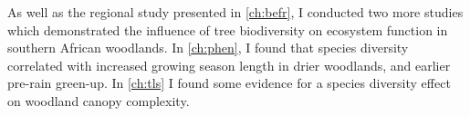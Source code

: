 \begin{refsection}
As well as the regional study presented in \autoref{ch:befr}, I conducted two more studies which demonstrated the influence of tree biodiversity on ecosystem function in southern African woodlands. In \autoref{ch:phen}, I found that species diversity correlated with increased growing season length in drier woodlands, and earlier pre-rain green-up. In \autoref{ch:tls} I found some evidence for a species diversity effect on woodland canopy complexity. 






\end{refsection}
